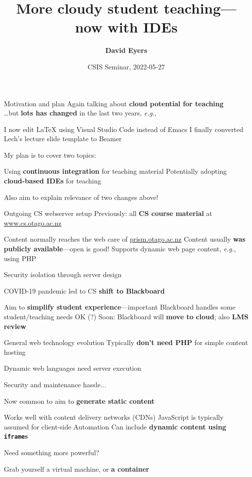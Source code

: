 \documentclass[aspectratio=169,t]{beamer}
\title[2022-05-27---CSIS Seminar---David Eyers]{More cloudy student teaching---now with IDEs}
\date{CSIS Seminar, 2022-05-27}
\author{\textbf{David Eyers}}
\begin{document}
\begin{frame}
  \titlepage
\end{frame}

\begin{dframe}{Motivation and plan}
  \1 Again talking about \textbf{cloud potential for teaching}\\
     \dots but \textbf{lots has changed} in the last two years, \emph{e.g.},

  \2 I now edit \LaTeX{} using Visual Studio Code instead of Emacs
  \2 I finally converted Lech's lecture slide template to Beamer
  
  \medskip

  \1 My plan is to cover two topics:

  \2 Using \textbf{continuous integration} for teaching material
  \2 Potentially adopting \textbf{cloud-based IDEs} for teaching

  \medskip

  \1 Also aim to explain relevance of two changes above!

\end{dframe}

\begin{dframe}{Outgoing CS webserver setup}
  \1 Previously: all \textbf{CS course material} at \url{www.cs.otago.ac.nz}

  \2 Content normally reaches the web care of \url{prism.otago.ac.nz}
  \2 Content usually \textbf{was publicly available}---open is good!
  \2 Supports dynamic web page content, \emph{e.g.}, using PHP
  
  \3 Security isolation through server design

  \medskip

  \1 COVID-19 pandemic led to CS \textbf{shift to Blackboard}

  \2 Aim to \textbf{simplify student experience}---important
  \2 Blackboard handles some student/teaching needs OK (?)
  \2 Soon: Blackboard will \textbf{move to cloud}; also \textbf{LMS review}
\end{dframe}

\begin{dframe}{General web technology evolution}
  \1 Typically \textbf{don't need PHP} for simple content hosting

  \2 Dynamic web languages need server execution
  
  \3 Security and maintenance hassle...

  \1 Now common to aim to \textbf{generate static content}

  \2 Works well with content delivery networks (CDNs)
  \2 JavaScript is typically assumed for client-side Automation
  \2 Can include \textbf{dynamic content using \texttt{iframe}s}

  \1 Need something more powerful?
  
  \2 Grab yourself a virtual machine, or \textbf{a container}
\end{dframe}
\end{document}
